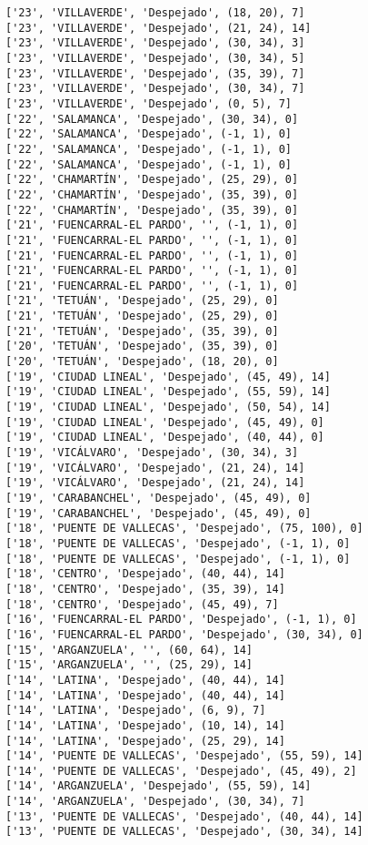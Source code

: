 \documentclass[11pt]{article}
\begin{document}
\begin{Verbatim}[commandchars=\\\{\}]
['23', 'VILLAVERDE', 'Despejado', (18, 20), 7]
['23', 'VILLAVERDE', 'Despejado', (21, 24), 14]
['23', 'VILLAVERDE', 'Despejado', (30, 34), 3]
['23', 'VILLAVERDE', 'Despejado', (30, 34), 5]
['23', 'VILLAVERDE', 'Despejado', (35, 39), 7]
['23', 'VILLAVERDE', 'Despejado', (30, 34), 7]
['23', 'VILLAVERDE', 'Despejado', (0, 5), 7]
['22', 'SALAMANCA', 'Despejado', (30, 34), 0]
['22', 'SALAMANCA', 'Despejado', (-1, 1), 0]
['22', 'SALAMANCA', 'Despejado', (-1, 1), 0]
['22', 'SALAMANCA', 'Despejado', (-1, 1), 0]
['22', 'CHAMARTÍN', 'Despejado', (25, 29), 0]
['22', 'CHAMARTÍN', 'Despejado', (35, 39), 0]
['22', 'CHAMARTÍN', 'Despejado', (35, 39), 0]
['21', 'FUENCARRAL-EL PARDO', '', (-1, 1), 0]
['21', 'FUENCARRAL-EL PARDO', '', (-1, 1), 0]
['21', 'FUENCARRAL-EL PARDO', '', (-1, 1), 0]
['21', 'FUENCARRAL-EL PARDO', '', (-1, 1), 0]
['21', 'FUENCARRAL-EL PARDO', '', (-1, 1), 0]
['21', 'TETUÁN', 'Despejado', (25, 29), 0]
['21', 'TETUÁN', 'Despejado', (25, 29), 0]
['21', 'TETUÁN', 'Despejado', (35, 39), 0]
['20', 'TETUÁN', 'Despejado', (35, 39), 0]
['20', 'TETUÁN', 'Despejado', (18, 20), 0]
['19', 'CIUDAD LINEAL', 'Despejado', (45, 49), 14]
['19', 'CIUDAD LINEAL', 'Despejado', (55, 59), 14]
['19', 'CIUDAD LINEAL', 'Despejado', (50, 54), 14]
['19', 'CIUDAD LINEAL', 'Despejado', (45, 49), 0]
['19', 'CIUDAD LINEAL', 'Despejado', (40, 44), 0]
['19', 'VICÁLVARO', 'Despejado', (30, 34), 3]
['19', 'VICÁLVARO', 'Despejado', (21, 24), 14]
['19', 'VICÁLVARO', 'Despejado', (21, 24), 14]
['19', 'CARABANCHEL', 'Despejado', (45, 49), 0]
['19', 'CARABANCHEL', 'Despejado', (45, 49), 0]
['18', 'PUENTE DE VALLECAS', 'Despejado', (75, 100), 0]
['18', 'PUENTE DE VALLECAS', 'Despejado', (-1, 1), 0]
['18', 'PUENTE DE VALLECAS', 'Despejado', (-1, 1), 0]
['18', 'CENTRO', 'Despejado', (40, 44), 14]
['18', 'CENTRO', 'Despejado', (35, 39), 14]
['18', 'CENTRO', 'Despejado', (45, 49), 7]
['16', 'FUENCARRAL-EL PARDO', 'Despejado', (-1, 1), 0]
['16', 'FUENCARRAL-EL PARDO', 'Despejado', (30, 34), 0]
['15', 'ARGANZUELA', '', (60, 64), 14]
['15', 'ARGANZUELA', '', (25, 29), 14]
['14', 'LATINA', 'Despejado', (40, 44), 14]
['14', 'LATINA', 'Despejado', (40, 44), 14]
['14', 'LATINA', 'Despejado', (6, 9), 7]
['14', 'LATINA', 'Despejado', (10, 14), 14]
['14', 'LATINA', 'Despejado', (25, 29), 14]
['14', 'PUENTE DE VALLECAS', 'Despejado', (55, 59), 14]
['14', 'PUENTE DE VALLECAS', 'Despejado', (45, 49), 2]
['14', 'ARGANZUELA', 'Despejado', (55, 59), 14]
['14', 'ARGANZUELA', 'Despejado', (30, 34), 7]
['13', 'PUENTE DE VALLECAS', 'Despejado', (40, 44), 14]
['13', 'PUENTE DE VALLECAS', 'Despejado', (30, 34), 14]

\end{Verbatim}
\end{document}
